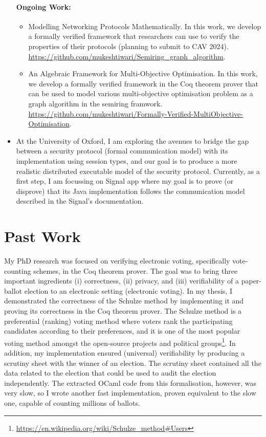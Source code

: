\documentclass[a4paper]{article}
\begin{document}
\begin{itemize}
 
\paragraph{Ongoing Work:} 
\begin{itemize}
\item Modelling Networking Protocols Mathematically. In this work, we develop 
a formally verified framework that researchers can use to verify 
the properties of their protocols (planning to submit to CAV 2024).
\url{https://github.com/mukeshtiwari/Semiring_graph_algorithm}. 


\item {An Algebraic Framework for Multi-Objective Optimisation. In this work, we develop 
a formally verified framework in the Coq theorem prover that can be used to model 
various multi-objective 
optimisation problem as a graph algorithm in the semiring framwork.
\url{https://github.com/mukeshtiwari/Formally-Verified-MultiObjective-Optimisation}}.
\end{itemize}

\item At the University of Oxford, I am exploring the avenues to bridge the gap between a security protocol 
(formal communication model) with its implementation using session types, and our 
goal is to produce a more realistic distributed executable model of the security protocol. 
Currently, as a first step, I am focussing on Signal app 
where my goal is to prove (or disprove) that its Java implementation follows the 
communication model described in the Signal's documentation. 
\end{itemize}

\section{Past Work}
My PhD research was focused on verifying electronic voting, specifically vote-counting schemes, in 
the Coq theorem prover. The goal was to 
bring  three important ingredients (i) correctness, (ii) privacy, and (iii) verifiability of a 
paper-ballot election to 
an electronic setting (electronic voting).
In my thesis, I demonstrated the correctness of the Schulze method 
by implementing it and proving its correctness in the Coq theorem 
prover. The Schulze method is a preferential (ranking) voting method where voters rank the participating 
candidates according to their preferences, and it is one of the most popular voting method 
amongst the open-source projects and 
political groups\footnote{\url{https://en.wikipedia.org/wiki/Schulze_method#Users}}.
In addition, my implementation 
ensured (universal) verifiability by producing a scrutiny sheet 
with the winner of an election. The scrutiny sheet contained all the data related 
to the election that could be used to audit the election independently. 
The extracted OCaml code from this formalisation, however, was 
very slow, so I wrote another fast implementation, proven equivalent to the slow one,
capable of counting millions of ballots.
\end{document}
